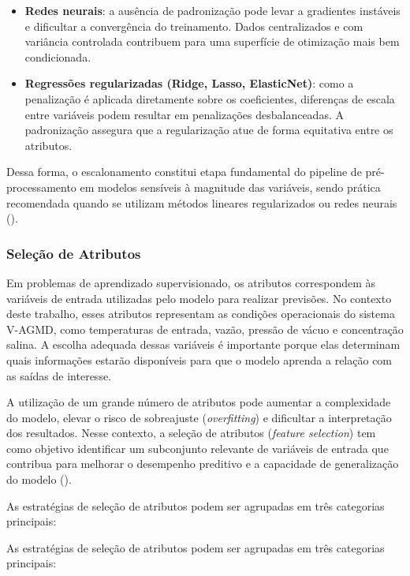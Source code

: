 \begin{itemize}
    \item \textbf{Redes neurais}: a ausência de padronização pode levar a gradientes instáveis e dificultar a convergência do treinamento. Dados centralizados e com variância controlada contribuem para uma superfície de otimização mais bem condicionada.

    \item \textbf{Regressões regularizadas (Ridge, Lasso, ElasticNet)}: como a penalização é aplicada diretamente sobre os coeficientes, diferenças de escala entre variáveis podem resultar em penalizações desbalanceadas. A padronização assegura que a regularização atue de forma equitativa entre os atributos.
\end{itemize}

Dessa forma, o escalonamento constitui etapa fundamental do pipeline de pré-processamento em modelos sensíveis à magnitude das variáveis, sendo prática recomendada quando se utilizam métodos lineares regularizados ou redes neurais (\cite{Sarkar2018PML}).
\subsubsection{Seleção de Atributos}

Em problemas de aprendizado supervisionado, os atributos correspondem às variáveis de entrada utilizadas pelo modelo para realizar previsões. No contexto deste trabalho, esses atributos representam as condições operacionais do sistema V-AGMD, como temperaturas de entrada, vazão, pressão de vácuo e concentração salina. A escolha adequada dessas variáveis é importante porque elas determinam quais informações estarão disponíveis para que o modelo aprenda a relação com as saídas de interesse.

A utilização de um grande número de atributos pode aumentar a complexidade do modelo, elevar o risco de sobreajuste (\textit{overfitting}) e dificultar a interpretação dos resultados. Nesse contexto, a seleção de atributos (\textit{feature selection}) tem como objetivo identificar um subconjunto relevante de variáveis de entrada que contribua para melhorar o desempenho preditivo e a capacidade de generalização do modelo (\cite{Sarkar2018PML}).

As estratégias de seleção de atributos podem ser agrupadas em três categorias principais:

As estratégias de seleção de atributos podem ser agrupadas em três categorias principais:

